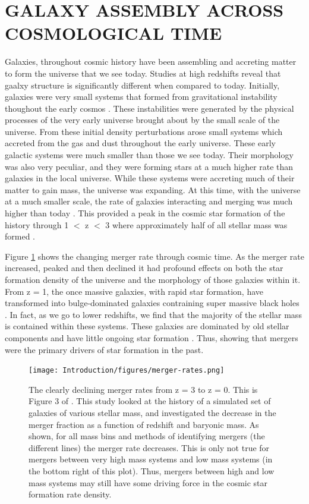 \section{GALAXY ASSEMBLY ACROSS COSMOLOGICAL TIME}
\noindent Galaxies, throughout cosmic history have been assembling and accreting matter to form the universe that we see today. Studies at high redshifts reveal that gaalxy structure is significantly different when compared to today. Initially, galaxies were very small systems that formed from gravitational instability thoughout the early cosmos \citep{1993MNRAS.262..627L}. These instabilities were generated by the physical processes of the very early universe brought about by the small scale of the universe. From these initial density perturbations arose small systems which accreted from the gas and dust throughout the early universe. These early galactic systems were much smaller than those we see today. Their morphology was also very peculiar, and they were forming stars at a much higher rate than galaxies in the local universe. While these systems were accreting much of their matter to gain mass, the universe was expanding. At this time, with the universe at a much smaller scale, the rate of galaxies interacting and merging was much higher than today \citep{2010ApJ...715..202H, 2011ApJ...742..103L}. This provided a peak in the cosmic star formation of the history through 1 $<$ z $<$ 3 where approximately half of all stellar mass was formed \citep{2005ApJ...625..621B}.

Figure \ref{fig:merger-rate} shows the changing merger rate through cosmic time. As the merger rate increased, peaked and then declined it had profound effects on both the star formation density of the universe and the morphology of those galaxies within it. From z = 1, the once massive galaxies, with rapid star formation, have transformed into bulge-dominated galaxies contraining super massive black holes \citep{2007ApJ...654..858B}. In fact, as we go to lower redshifts, we find that the majority of the stellar mass is contained within these systems. These galaxies are dominated by old stellar components and have little ongoing star formation \citep{2002AJ....124..646H, 2004ApJ...608..752B}. Thus, showing that mergers were the primary drivers of star formation in the past. 

\begin{figure}
    \centering
    \texttt{[image: Introduction/figures/merger-rates.png]}
    \caption{The clearly declining merger rates from z = 3 to z = 0. This is Figure 3 of \citet{2010ApJ...715..202H}. This study looked at the history of a simulated set of galaxies of various stellar mass, and investigated the decrease in the merger fraction as a function of redshift and baryonic mass. As shown, for all mass bins and methods of identifying mergers (the different lines) the merger rate decreases. This is only not true for mergers between very high mass systems and low mass systems (in the bottom right of this plot). Thus, mergers between high and low mass systems may still have some driving force in the cosmic star formation rate density.}
    \label{fig:merger-rate}
\end{figure}

